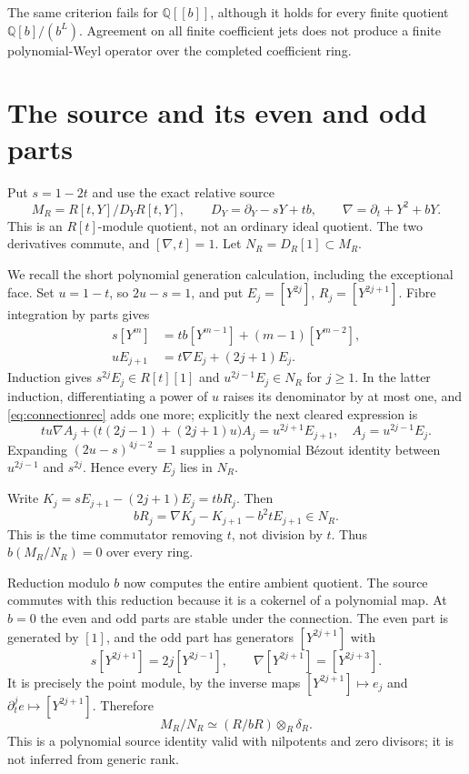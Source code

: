 \documentclass[11pt]{article}
\theoremstyle{definition}\newtheorem{definition}[theorem]{Definition}
\theoremstyle{remark}\newtheorem{remark}[theorem]{Remark}
\begin{document}
The same criterion fails for $\mathbb Q[[b]]$, although it holds
for every finite quotient $\mathbb Q[b]/(b^L)$. Agreement on all
finite coefficient jets does not produce a finite polynomial-Weyl
operator over the completed coefficient ring.

\section{The source and its even and odd parts}

Put $s=1-2t$ and use the exact relative source
\[
 M_R=R[t,Y]/D_YR[t,Y],\qquad
 D_Y=\partial_Y-sY+tb,\qquad
 \nabla=\partial_t+Y^2+bY.
\]
This is an $R[t]$-module quotient, not an ordinary ideal quotient.
The two derivatives commute, and $[\nabla,t]=1$. Let
$N_R=D_R[1]\subset M_R$.

We recall the short polynomial generation calculation, including
the exceptional face. Set $u=1-t$, so $2u-s=1$, and put
$E_j=[Y^{2j}]$, $R_j=[Y^{2j+1}]$. Fibre integration by parts gives
\begin{align}
 s[Y^m]&=tb[Y^{m-1}]+(m-1)[Y^{m-2}],\label{eq:wickrec}\\
 uE_{j+1}&=t\nabla E_j+(2j+1)E_j.\label{eq:connectionrec}
\end{align}
Induction gives $s^{2j}E_j\in R[t][1]$ and
$u^{2j-1}E_j\in N_R$ for $j\ge1$. In the latter induction,
differentiating a power of $u$ raises its denominator by at most
one, and \eqref{eq:connectionrec} adds one more; explicitly the
next cleared expression is
\[
 tu\nabla A_j+\bigl(t(2j-1)+(2j+1)u\bigr)A_j
       =u^{2j+1}E_{j+1},\quad A_j=u^{2j-1}E_j.
\]
Expanding $(2u-s)^{4j-2}=1$ supplies a polynomial B\'ezout identity
between $u^{2j-1}$ and $s^{2j}$. Hence every $E_j$ lies in $N_R$.

Write $K_j=sE_{j+1}-(2j+1)E_j=tbR_j$. Then
\begin{equation}\label{eq:content}
 bR_j=\nabla K_j-K_{j+1}-b^2tE_{j+1}\in N_R.
\end{equation}
This is the time commutator removing $t$, not division by $t$.
Thus $b(M_R/N_R)=0$ over every ring.

Reduction modulo $b$ now computes the entire ambient quotient.
The source commutes with this reduction because it is a cokernel
of a polynomial map. At $b=0$ the even and odd parts are stable
under the connection. The even part is generated by $[1]$, and
the odd part has generators $[Y^{2j+1}]$ with
\[
 s[Y^{2j+1}]=2j[Y^{2j-1}],\qquad
 \nabla[Y^{2j+1}]=[Y^{2j+3}].
\]
It is precisely the point module, by the inverse maps
$[Y^{2j+1}]\mapsto e_j$ and $\partial_t^j e\mapsto[Y^{2j+1}]$.
Therefore
\begin{equation}\label{eq:ambientdefect}
 M_R/N_R\simeq(R/bR)\otimes_R\delta_R.
\end{equation}
This is a polynomial source identity valid with nilpotents and
zero divisors; it is not inferred from generic rank.
\end{document}
